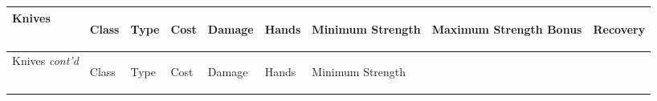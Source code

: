 \documentclass[twoside]{book}
\begin{document}
\begin{longtable}{p{1.25in}llllp{2em}p{3em}p{3em}l} 
  Knives
  &
  \begin{turn}{70}{Class}\end{turn}
          
  &
  \begin{turn}{70}{Type}\end{turn}
          
  &
  \begin{turn}{70}{Cost}\end{turn}
          
  &
  \begin{turn}{70}{Damage}\end{turn}
          
  &
  \begin{turn}{70}{Hands}\end{turn}
          
  &
  \begin{turn}{70}{Minimum Strength}\end{turn}
          
  &
  \begin{turn}{70}{Maximum Strength Bonus}\end{turn}
          
  &
  \begin{turn}{70}{Recovery}\end{turn}
          
  \\
  \hline
  \hline
  \endfirsthead
  Knives \textit{cont'd}
        
  &
  \begin{turn}{70}{Class}\end{turn}
          
  &
  \begin{turn}{70}{Type}\end{turn}
          
  &
  \begin{turn}{70}{Cost}\end{turn}
          
  &
  \begin{turn}{70}{Damage}\end{turn}
          
  &
  \begin{turn}{70}{Hands}\end{turn}
          
  &
  \begin{turn}{70}{Minimum Strength}\end{turn}
          

\end{longtable}
\end{document}
